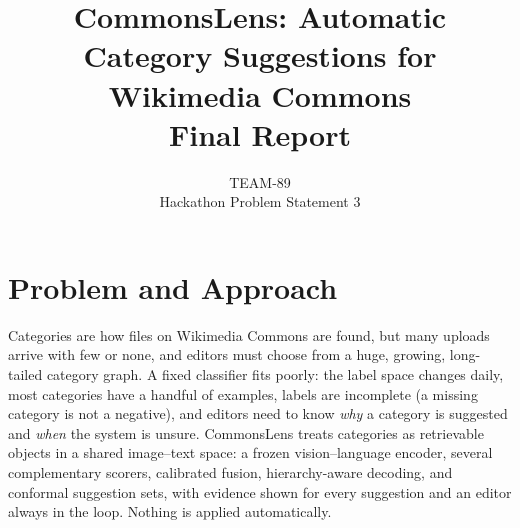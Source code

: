 \documentclass[10pt,twocolumn]{article}
\title{\vspace{-1.4cm}\textbf{CommonsLens: Automatic Category Suggestions for Wikimedia Commons}\\
\large Final Report\vspace{-0.25cm}}
\author{TEAM-89\\\small Hackathon Problem Statement 3}
\date{\vspace{-0.9cm}}
\begin{document}
\maketitle

\section{Problem and Approach}
Categories are how files on Wikimedia Commons are found, but many uploads arrive with few or none, and
editors must choose from a huge, growing, long-tailed category graph. A fixed classifier fits poorly: the
label space changes daily, most categories have a handful of examples, labels are incomplete (a missing
category is not a negative), and editors need to know \emph{why} a category is suggested and \emph{when}
the system is unsure. CommonsLens treats categories as retrievable objects in a shared image--text space:
a frozen vision--language encoder, several complementary scorers, calibrated fusion, hierarchy-aware
decoding, and conformal suggestion sets, with evidence shown for every suggestion and an editor always in
the loop. Nothing is applied automatically.
\end{document}
